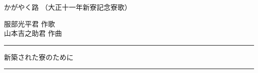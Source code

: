 \documentclass[10pt,b5j]{tarticle} %
\begin{document}
\begin{minipage}[c]{0.7\hsize} %
    \begin{center}
        {\LARGE
            かがやく路 %
        }
        {\small 
            （大正十一年新寮記念寮歌） %
        }
    \end{center}
\end{minipage}
\begin{minipage}[c]{0.3\hsize} %
    \begin{flushright} %
        服部光平君 作歌\\山本吉之助君 作曲 %
    \end{flushright}
\end{minipage}
\begin{minipage}[c]{0.7\hsize}
    \begin{center}
        {\large 
            \rule[0.0em]{1.5em}{0.05em} 新築された寮のために \rule[0.0em]{1.5em}{0.05em}
        }
    \end{center}
\end{minipage}
\end{document}
